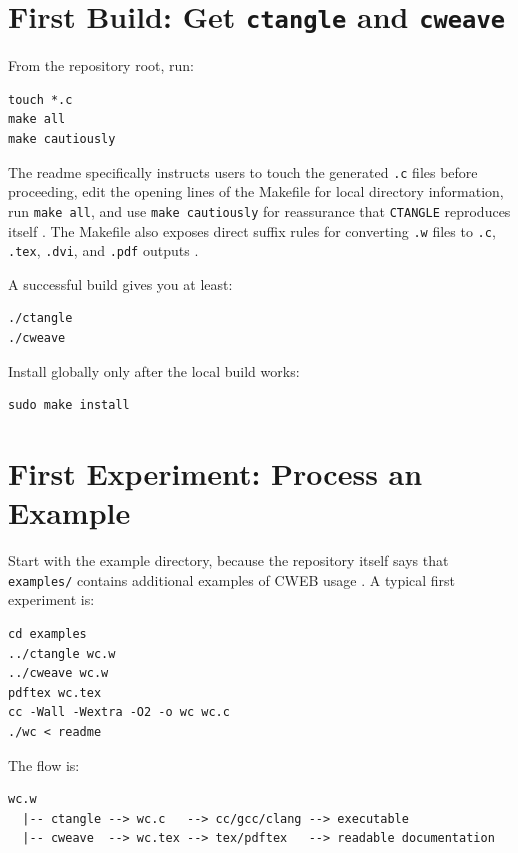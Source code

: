 \documentclass[11pt]{article}
\begin{document}
\section{First Build: Get \texttt{ctangle} and \texttt{cweave}}

From the repository root, run:

\begin{verbatim}
touch *.c
make all
make cautiously
\end{verbatim}

The readme specifically instructs users to touch the generated \texttt{.c} files before proceeding, edit the opening lines of the Makefile for local directory information, run \texttt{make all}, and use \texttt{make cautiously} for reassurance that \texttt{CTANGLE} reproduces itself \cite{repo-readme}. The Makefile also exposes direct suffix rules for converting \texttt{.w} files to \texttt{.c}, \texttt{.tex}, \texttt{.dvi}, and \texttt{.pdf} outputs \cite{repo-makefile}.

A successful build gives you at least:

\begin{verbatim}
./ctangle
./cweave
\end{verbatim}

Install globally only after the local build works:

\begin{verbatim}
sudo make install
\end{verbatim}

\section{First Experiment: Process an Example}

Start with the example directory, because the repository itself says that \texttt{examples/} contains additional examples of CWEB usage \cite{repo-readme}. A typical first experiment is:

\begin{verbatim}
cd examples
../ctangle wc.w
../cweave wc.w
pdftex wc.tex
cc -Wall -Wextra -O2 -o wc wc.c
./wc < readme
\end{verbatim}

The flow is:

\begin{verbatim}
wc.w
  |-- ctangle --> wc.c   --> cc/gcc/clang --> executable
  |-- cweave  --> wc.tex --> tex/pdftex   --> readable documentation
\end{verbatim}
\end{document}
